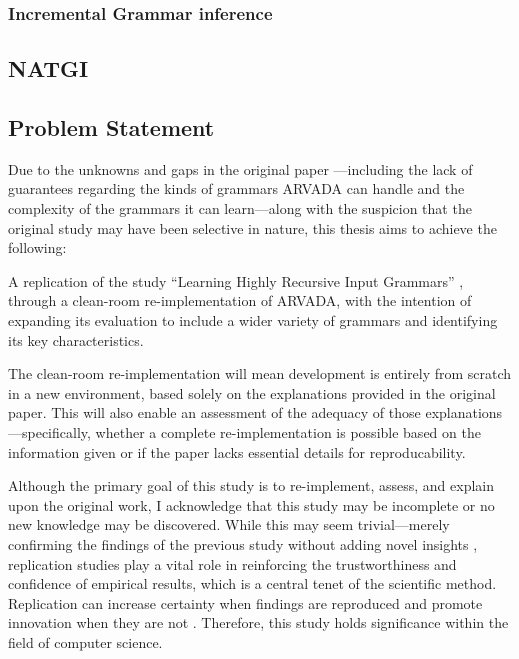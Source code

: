 \subsubsection{Incremental Grammar inference}



\subsection{NATGI}

\subsection{Problem Statement}

Due to the unknowns and gaps in the original paper \cite{kulkarniLearningHighlyRecursive2021}—including the lack of guarantees regarding the kinds of grammars ARVADA can handle and the complexity of the grammars it can learn—along with the suspicion that the original study may have been selective in nature, this thesis aims to achieve the following:

\vspace{\baselineskip}
A replication of the study “Learning Highly Recursive Input Grammars” \cite{kulkarniLearningHighlyRecursive2021}, through a clean-room re-implementation of ARVADA, with the intention of expanding its evaluation to include a wider variety of grammars and identifying its key characteristics.

\vspace{\baselineskip}
The clean-room re-implementation will mean development is entirely from scratch in a new environment, based solely on the explanations provided in the original paper. This will also enable an assessment of the adequacy of those explanations—specifically, whether a complete re-implementation is possible based on the information given or if the paper lacks essential details for reproducability.

\vspace{\baselineskip}
Although the primary goal of this study is to re-implement, assess, and explain upon the original work, I acknowledge that this study may be incomplete or no new knowledge may be discovered. While this may seem trivial—merely confirming the findings of the previous study without adding novel insights \cite{hendriksConsiderItParsed}, replication studies play a vital role in reinforcing the trustworthiness and confidence of empirical results, which is a central tenet of the scientific method. Replication can increase certainty when findings are reproduced and promote innovation when they are not \cite{shepperdReplicationStudiesConsidered2018}. Therefore, this study holds significance within the field of computer science.

